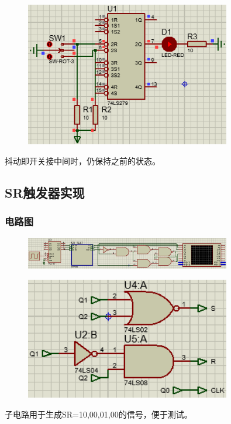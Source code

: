 \documentclass[UTF8, a4paper, 11pt]{article}
\begin{document}
\begin{figure}[H]
    \centering
    \includegraphics[width=0.8\textwidth]{ex9.5.4.png}
\end{figure}
抖动即开关接中间时，仍保持之前的状态。
\subsection{SR触发器实现}
\subsubsection{电路图}
\begin{figure}[H]
    \centering
    \includegraphics[width=0.8\textwidth]{ex9.6电路图.png}
\end{figure}
\begin{figure}[H]
    \centering
    \includegraphics[width=0.8\textwidth]{ex9.6子电路图.png}
\end{figure}
子电路用于生成SR=10,00,01,00的信号，便于测试。
\end{document}
